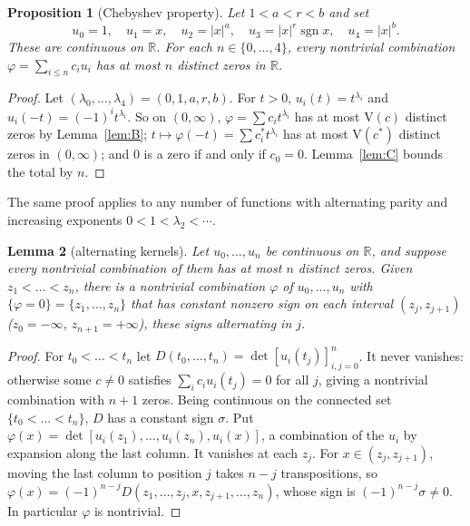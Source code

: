 \documentclass[11pt]{article}
\newtheorem{lemmaL}{Lemma}
\newtheorem{propL}[lemmaL]{Proposition}
\theoremstyle{remark}
\begin{document}
\begin{propL}[Chebyshev property]\label{prop:D}
Let $1<a<r<b$ and set
\[
u_0=1,\quad u_1=x,\quad u_2=|x|^a,\quad u_3=|x|^r\operatorname{sgn}x,\quad u_4=|x|^b .
\]
These are continuous on $\mathbb R$. For each $n\in\{0,\dots,4\}$, every nontrivial combination $\varphi=\sum_{i\le n}c_iu_i$ has at most $n$ distinct zeros in $\mathbb R$.
\end{propL}
\begin{proof}
Let $(\lambda_0,\dots,\lambda_4)=(0,1,a,r,b)$. For $t>0$, $u_i(t)=t^{\lambda_i}$ and $u_i(-t)=(-1)^it^{\lambda_i}$. So on $(0,\infty)$, $\varphi=\sum c_it^{\lambda_i}$ has at most $\mathrm V(c)$ distinct zeros by Lemma~\ref{lem:B}; $t\mapsto\varphi(-t)=\sum c_i^*t^{\lambda_i}$ has at most $\mathrm V(c^*)$ distinct zeros in $(0,\infty)$; and $0$ is a zero if and only if $c_0=0$. Lemma~\ref{lem:C} bounds the total by $n$.
\end{proof}
The same proof applies to any number of functions with alternating parity and increasing exponents $0<1<\lambda_2<\cdots$.

\begin{lemmaL}[alternating kernels]\label{lem:E}
Let $u_0,\dots,u_n$ be continuous on $\mathbb R$, and suppose every nontrivial combination of them has at most $n$ distinct zeros. Given $z_1<\dots<z_n$, there is a nontrivial combination $\varphi$ of $u_0,\dots,u_n$ with $\{\varphi=0\}=\{z_1,\dots,z_n\}$ that has constant nonzero sign on each interval $(z_j,z_{j+1})$ ($z_0=-\infty$, $z_{n+1}=+\infty$), these signs alternating in $j$.
\end{lemmaL}
\begin{proof}
For $t_0<\dots<t_n$ let $D(t_0,\dots,t_n)=\det[u_i(t_j)]_{i,j=0}^n$. It never vanishes: otherwise some $c\ne0$ satisfies $\sum_ic_iu_i(t_j)=0$ for all $j$, giving a nontrivial combination with $n+1$ zeros. Being continuous on the connected set $\{t_0<\dots<t_n\}$, $D$ has a constant sign $\sigma$. Put $\varphi(x)=\det[u_i(z_1),\dots,u_i(z_n),u_i(x)]$, a combination of the $u_i$ by expansion along the last column. It vanishes at each $z_j$. For $x\in(z_j,z_{j+1})$, moving the last column to position $j$ takes $n-j$ transpositions, so $\varphi(x)=(-1)^{n-j}D(z_1,\dots,z_j,x,z_{j+1},\dots,z_n)$, whose sign is $(-1)^{n-j}\sigma\ne0$. In particular $\varphi$ is nontrivial.
\end{proof}
\end{document}
